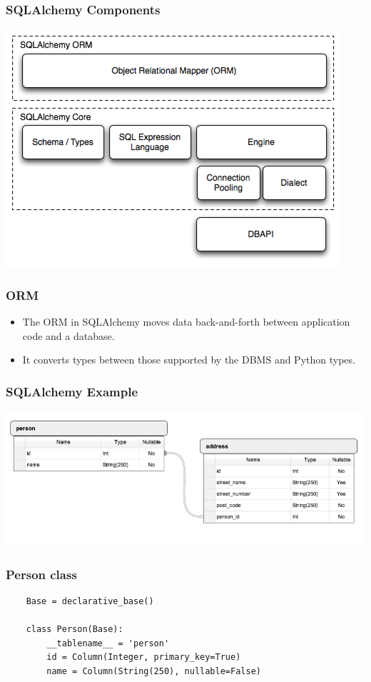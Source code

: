 \documentclass[10pt]{beamer}
\begin{document}
\begin{frame}
	\frametitle{SQLAlchemy Components}
	
	\includegraphics[scale=0.6]{sqla_arch_small.png}
	
\end{frame}
\begin{frame}
	\frametitle{ORM}
	\begin{itemize}
		\item The ORM in SQLAlchemy moves data back-and-forth between application code and a database.
		\item It converts types between those supported by the DBMS and Python types.
	\end{itemize}
\end{frame}
\begin{frame}
	\frametitle{SQLAlchemy Example}
	
	\includegraphics[scale=0.4]{erd.png}
	
\end{frame}

\begin{frame}[fragile]
	\frametitle{Person class}
	\begin{verbatim}
	Base = declarative_base()
	
    class Person(Base):
        __tablename__ = 'person'
        id = Column(Integer, primary_key=True)
        name = Column(String(250), nullable=False)
	\end{verbatim}
\end{frame}
\end{document}
